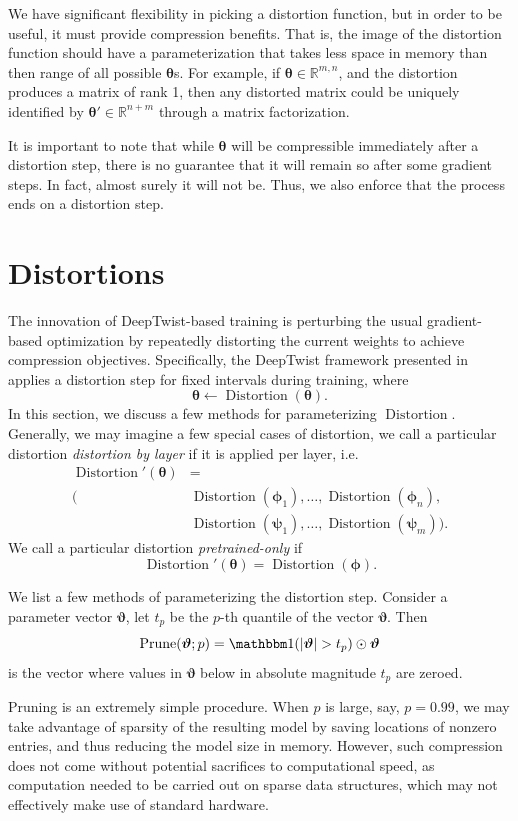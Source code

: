 \documentclass[10pt]{article}
\newcommand{\distortion}{\operatorname{Distortion}}
\newcommand{\prune}{\operatorname{Prune}}
\newcommand{\btheta}{{\bm{\theta}}}
\newcommand{\bphi}{{\bm{\phi}}}
\newcommand{\bpsi}{{\bm{\psi}}}
\newcommand{\bvartheta}{{\bm{\vartheta}}}
\begin{document}
We have significant flexibility in picking a distortion function, but in order
to be useful, it must provide compression benefits. That is, the image of the
distortion function should have a parameterization that takes less space in
memory than then range of all possible $\btheta$s. For example, if $\btheta \in
\mathbb{R}^{m,n}$, and the distortion produces a matrix of rank 1, then any
distorted matrix could be uniquely identified by $\btheta' \in \mathbb{R}^{n+m}$
through a matrix factorization.

It is important to note that while $\btheta$ will be compressible immediately
after a distortion step, there is no guarantee that it will remain so after some
gradient steps. In fact, almost surely it will not be. Thus, we also enforce
that the process ends on a distortion step.

\section{Distortions}
\label{sec:distortions}
The innovation of DeepTwist-based training is perturbing the usual
gradient-based optimization by repeatedly distorting the current weights to
achieve compression objectives. Specifically, the DeepTwist framework presented
in  applies a distortion step for fixed intervals during
training, where \[
\btheta \gets \distortion(\btheta). 
\]
In this section, we discuss a few methods for parameterizing $\distortion$.
Generally, we may imagine a few special cases of distortion, we call a
particular distortion \emph{distortion by layer} if it is applied per layer,
i.e. \begin{align*}
\distortion'(\btheta) &= \\
(&\distortion(\bphi_1),\ldots,\distortion(\bphi_n),\\
&\distortion(\bpsi_1),\ldots, \distortion(\bpsi_m)).
\end{align*}
We call a particular distortion \emph{pretrained-only} if \[
\distortion'(\btheta) = \distortion(\bphi).
\]

We list a few methods of parameterizing the distortion step. 
 Consider a parameter vector $\bvartheta$, let
  $t_p$ be the $p$-th quantile of the vector $\bvartheta$. Then \[
  \prune(\bvartheta; p) = \one(|\bvartheta| > t_p) \odot \bvartheta
  \]
  is the vector where values in $\bvartheta$ below in absolute magnitude $t_p$
  are zeroed. 
  
  Pruning is an extremely simple procedure. When $p$ is large, say, $p=0.99$,
  we may take advantage of sparsity of the resulting model by saving locations
  of nonzero entries, and thus reducing the model size in memory. However,
  such compression does not come without potential sacrifices to computational
  speed, as computation needed to be carried out on sparse data structures,
  which may not effectively make use of standard hardware.
  
\end{document}
